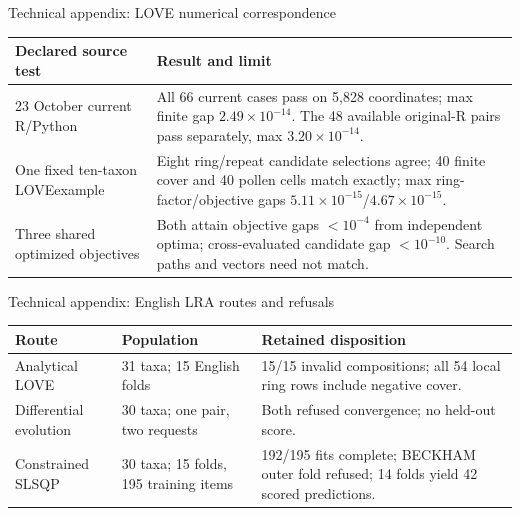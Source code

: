 \begin{frame}{Technical appendix: LOVE numerical correspondence}
\scriptsize
\begin{tabular}{p{}p{}}
\toprule
Declared source test & Result and limit \\
\midrule
23 October current R/Python & All 66 current cases pass on 5,828 coordinates; max finite gap $2.49\times10^{-14}$. The 48 available original-R pairs pass separately, max $3.20\times10^{-14}$. \\
One fixed ten-taxon LOVEexample & Eight ring/repeat candidate selections agree; 40 finite cover and 40 pollen cells match exactly; max ring-factor/objective gaps $5.11\times10^{-15}$/$4.67\times10^{-15}$. \\
Three shared optimized objectives & Both attain objective gaps $<10^{-4}$ from independent optima; cross-evaluated candidate gap $<10^{-10}$. Search paths and vectors need not match. \\
\bottomrule
\end{tabular}
\end{frame}

\begin{frame}{Technical appendix: English LRA routes and refusals}
\scriptsize
\begin{tabular}{p{}p{}p{}}
\toprule
Route & Population & Retained disposition \\
\midrule
Analytical LOVE & 31 taxa; 15 English folds & 15/15 invalid compositions; all 54 local ring rows include negative cover. \\
Differential evolution & 30 taxa; one pair, two requests & Both refused convergence; no held-out score. \\
Constrained SLSQP & 30 taxa; 15 folds, 195 training items & 192/195 fits complete; BECKHAM outer fold refused; 14 folds yield 42 scored predictions. \\
\bottomrule
\end{tabular}
\end{frame}

